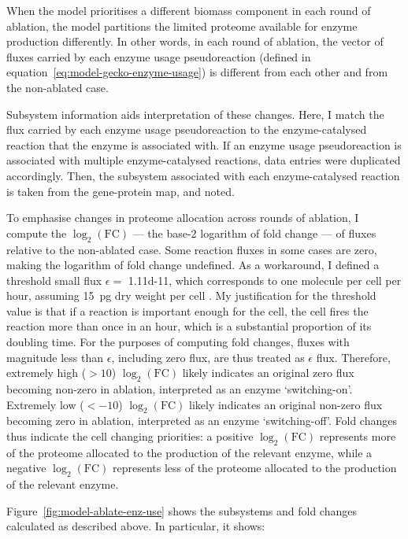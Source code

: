 When the model prioritises a different biomass component in each round of ablation, the model partitions the limited proteome available for enzyme production differently.
In other words, in each round of ablation, the vector of fluxes carried by each enzyme usage pseudoreaction (defined in equation~\ref{eq:model-gecko-enzyme-usage}) is different from each other and from the non-ablated case.

Subsystem information aids interpretation of these changes.
Here, I match the flux carried by each enzyme usage pseudoreaction to the enzyme-catalysed reaction that the enzyme is associated with.
If an enzyme usage pseudoreaction is associated with multiple enzyme-catalysed reactions, data entries were duplicated accordingly.
Then, the subsystem associated with each enzyme-catalysed reaction is taken from the gene-protein map, and noted.

To emphasise changes in proteome allocation across rounds of ablation, I compute the $\log_{2}(\mathrm{FC})$ --- the base-2 logarithm of fold change --- of fluxes relative to the non-ablated case.
Some reaction fluxes in some cases are zero, making the logarithm of fold change undefined.
As a workaround, I defined a threshold small flux $\epsilon = $ \SI{1.11d-11}{\mmolgdwh}, which corresponds to one molecule per cell per hour, assuming \SI{15}{\pico\gram} dry weight per cell \parencite{shermanGettingStartedYeast2002}.
My justification for the threshold value is that if a reaction is important enough for the cell, the cell fires the reaction more than once in an hour, which is a substantial proportion of its doubling time.
For the purposes of computing fold changes, fluxes with magnitude less than $\epsilon$, including zero flux, are thus treated as $\epsilon$ flux.
Therefore, extremely high ($> 10$) $\log_{2}(\mathrm{FC})$ likely indicates an original zero flux becoming non-zero in ablation, interpreted as an enzyme `switching-on'.
Extremely low ($< -10$) $\log_{2}(\mathrm{FC})$ likely indicates an original non-zero flux becoming zero in ablation, interpreted as an enzyme `switching-off'.
Fold changes thus indicate the cell changing priorities: a positive $\log_{2}(\mathrm{FC})$ represents more of the proteome allocated to the production of the relevant enzyme, while a negative $\log_{2}(\mathrm{FC})$ represents less of the proteome allocated to the production of the relevant enzyme.

Figure~\ref{fig:model-ablate-enz-use} shows the subsystems and fold changes calculated as described above.
In particular, it shows:

